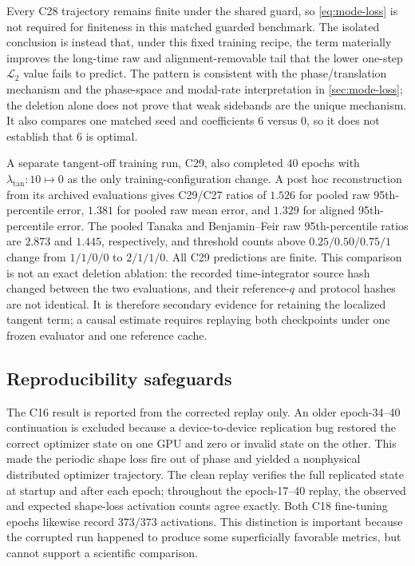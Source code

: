 Every C28 trajectory remains finite under the shared guard, so
\eqref{eq:mode-loss} is not required for finiteness in this matched guarded
benchmark. The isolated conclusion
is instead that, under this fixed training recipe, the term materially
improves the long-time raw and alignment-removable tail that the lower one-step
$\mathcal L_2$ value fails to predict. The pattern is consistent with the
phase/translation mechanism and the
phase-space and modal-rate interpretation in \cref{sec:mode-loss}; the deletion
alone does not prove that weak sidebands are the unique mechanism.  It also
compares one matched seed and coefficients 6 versus 0, so it does not establish
that 6 is optimal.

A separate tangent-off training run, C29, also completed 40 epochs with
$\lambda_{\mathrm{tan}}:10\mapsto0$ as the only training-configuration
change.  A post hoc reconstruction from its archived evaluations gives
C29/C27 ratios of $1.526$ for pooled raw 95th-percentile error, $1.381$ for
pooled raw mean error, and $1.329$ for aligned 95th-percentile error.  The
pooled Tanaka and Benjamin--Feir raw 95th-percentile ratios are $2.873$ and
$1.445$, respectively, and threshold counts above
$0.25/0.50/0.75/1$ change from $1/1/0/0$ to $2/1/1/0$.  All C29 predictions
are finite.  This comparison is not an exact deletion ablation: the recorded
time-integrator source hash changed between the two evaluations, and their
reference-$q$ and protocol hashes are not identical.  It is therefore
secondary evidence for retaining the localized tangent term; a causal
estimate requires replaying both checkpoints under one frozen evaluator and
one reference cache.

\subsection{Reproducibility safeguards}

The C16 result is reported from the corrected replay only. An older
epoch-34--40 continuation is excluded because a device-to-device replication
bug restored the correct optimizer state on one GPU and zero or invalid state
on the other. This made the periodic shape loss fire out of phase and yielded
a nonphysical distributed optimizer trajectory. The clean replay verifies
the full replicated state at startup and after each epoch; throughout the
epoch-17--40 replay, the observed and expected shape-loss activation counts
agree exactly. Both C18 fine-tuning epochs likewise record $373/373$
activations. This distinction is important because the corrupted run happened
to produce some superficially favorable metrics, but cannot support a
scientific comparison.
